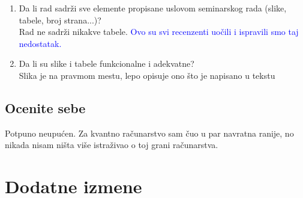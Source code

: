 \documentclass[a4paper]{report}
\newcommand{\odgovor}[1]{\textcolor{blue}{#1}}
\begin{document}
\begin{enumerate}
\item Da li rad sadrži sve elemente propisane uslovom seminarskog rada (slike, tabele, broj strana...)?\\
Rad ne sadrži nikakve tabele.
\odgovor {Ovo su svi recenzenti uočili i ispravili smo taj nedostatak.}

\item Da li su slike i tabele funkcionalne i adekvatne?\\
Slika je na pravmom mestu, lepo opisuje ono što je napisano u tekstu
\end{enumerate}

\section{Ocenite sebe}
Potpuno neupućen. Za kvantno računarstvo sam čuo u par navratna ranije, no nikada nisam ništa više istraživao o toj grani računarstva.


\chapter{Dodatne izmene}
\end{document}
